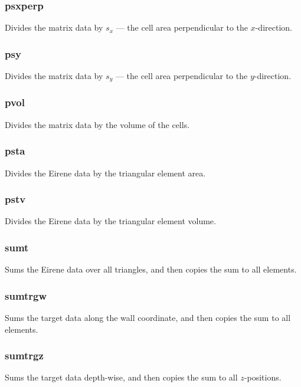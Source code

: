 \documentclass[a4paper,10pt]{report}
\begin{document}
\subsubsection{psxperp}\label{sec:psxperp}
Divides the matrix data by $s_x$ --- the cell area perpendicular to the
$x$-direction.

\subsubsection{psy}\label{sec:psy}
Divides the matrix data by $s_y$ --- the cell area perpendicular to the
$y$-direction.

\subsubsection{pvol}\label{sec:pvol}
Divides the matrix data by the volume of the cells.

\subsubsection{psta}\label{sec:psta}
Divides the Eirene data by the triangular element area.

\subsubsection{pstv}\label{sec:pstv}
Divides the Eirene data by the triangular element volume.

\subsubsection{sumt}\label{sec:sumt}
Sums the Eirene data over all triangles, and then copies the sum to all elements.

\subsubsection{sumtrgw}\label{sec:sumtrgw}
Sums the target data along the wall coordinate, and then copies the sum to all elements.

\subsubsection{sumtrgz}\label{sec:sumtrgz}
Sums the target data depth-wise, and then copies the sum to all $z$-positions.
\end{document}
